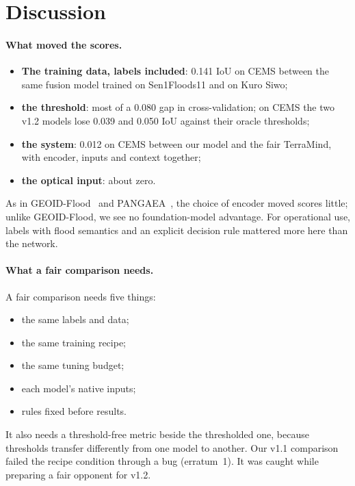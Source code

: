 \documentclass[10pt,twocolumn,a4paper]{article}
\begin{document}
\section{Discussion}\label{sec:discussion}

\paragraph{What moved the scores.}
\begin{itemize}
  \item \textbf{The training data, labels included}: 0.141 IoU on CEMS between the same fusion model trained on
    Sen1Floods11 and on Kuro Siwo;
  \item \textbf{the threshold}: most of a 0.080 gap in cross-validation; on CEMS the two v1.2 models lose 0.039 and
    0.050 IoU against their oracle thresholds;
  \item \textbf{the system}: 0.012 on CEMS between our model and the fair TerraMind, with encoder, inputs and
    context together;
  \item \textbf{the optical input}: about zero.
\end{itemize}
As in GEOID-Flood~\citep{chiriaco2026geoid} and PANGAEA~\citep{marsocci2024pangaea}, the choice of encoder moved
scores little; unlike GEOID-Flood, we see no foundation-model advantage. For operational use, labels with flood
semantics and an explicit decision rule mattered more here than the network.

\paragraph{What a fair comparison needs.} A fair comparison needs five things:
\begin{itemize}
  \item the same labels and data;
  \item the same training recipe;
  \item the same tuning budget;
  \item each model's native inputs;
  \item rules fixed before results.
\end{itemize}
It also needs a threshold-free metric beside the thresholded one, because thresholds transfer differently from one
model to another. Our v1.1 comparison failed the recipe condition through a bug (erratum~1). It was caught while
preparing a fair opponent for v1.2.
\end{document}
